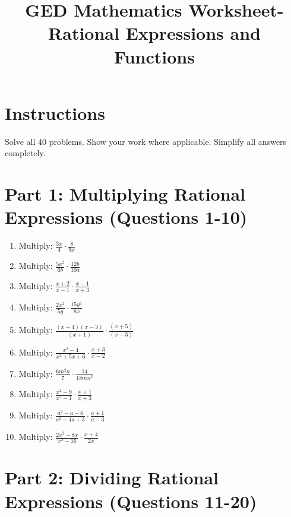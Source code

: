 \documentclass[12pt]{article}
\title{GED Mathematics Worksheet- Rational Expressions and Functions}
\author{}
\date{}
\begin{document}
\maketitle

\section*{Instructions}
Solve all 40 problems. Show your work where applicable. Simplify all answers completely.

\section*{Part 1: Multiplying Rational Expressions (Questions 1-10)}

\begin{enumerate}

\item Multiply: $\frac{3x}{4} \cdot \frac{8}{9x}$

\item Multiply: $\frac{5a^2}{6b} \cdot \frac{12b}{10a}$

\item Multiply: $\frac{x+2}{x-1} \cdot \frac{x-1}{x+3}$

\item Multiply: $\frac{2x^2}{5y} \cdot \frac{15y^2}{8x}$

\item Multiply: $\frac{(x+4)(x-3)}{(x+1)} \cdot \frac{(x+5)}{(x-3)}$

\item Multiply: $\frac{x^2-4}{x^2+5x+6} \cdot \frac{x+3}{x-2}$

\item Multiply: $\frac{6m^2n}{7} \cdot \frac{14}{18mn^2}$

\item Multiply: $\frac{x^2-9}{x^2-1} \cdot \frac{x+1}{x+3}$

\item Multiply: $\frac{a^2-a-6}{a^2+4a+3} \cdot \frac{a+1}{a-3}$

\item Multiply: $\frac{2x^2-8x}{x^2-16} \cdot \frac{x+4}{2x}$

\end{enumerate}

\section*{Part 2: Dividing Rational Expressions (Questions 11-20)}
\end{document}
